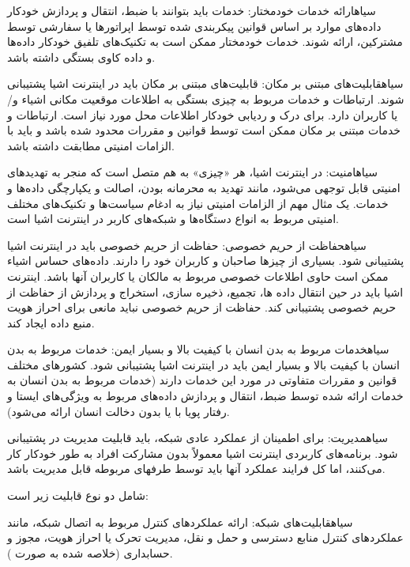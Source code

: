  ‌سیاه{ارائه خدمات خودمختار}:
خدمات باید بتوانند با ضبط، انتقال و پردازش خودکار داده‌های موارد بر اساس قوانین پیکربندی شده توسط اپراتورها یا سفارشی توسط مشترکین، ارائه شوند. خدمات خودمختار ممکن است به تکنیک‌های تلفیق خودکار داده‌ها و داده کاوی بستگی داشته باشد.

 ‌سیاه{قابلیت‌های مبتنی بر مکان}:
قابلیت‌های مبتنی بر مکان باید در اینترنت اشیا پشتیبانی شوند. ارتباطات و خدمات مربوط به چیزی بستگی به اطلاعات موقعیت مکانی اشیاء و/یا کاربران دارد. برای درک و ردیابی خودکار اطلاعات محل مورد نیاز است.
ارتباطات و خدمات مبتنی بر مکان ممکن است توسط قوانین و مقررات محدود شده باشد و باید با الزامات امنیتی مطابقت داشته باشد.

 ‌سیاه{امنیت}:
در اینترنت اشیا، هر «چیزی» به هم متصل است که منجر به تهدیدهای امنیتی قابل توجهی می‌شود، مانند تهدید به محرمانه بودن، اصالت و یکپارچگی داده‌ها و خدمات.
یک مثال مهم از الزامات امنیتی نیاز به ادغام سیاست‌ها و تکنیک‌های مختلف امنیتی مربوط به انواع دستگاه‌ها و شبکه‌های کاربر در اینترنت اشیا است.

 ‌سیاه{حفاظت از حریم خصوصی}:
حفاظت از حریم خصوصی باید در اینترنت اشیا پشتیبانی شود. بسیاری از چیزها صاحبان و کاربران خود را دارند. داده‌های حساس اشیاء ممکن است حاوی اطلاعات خصوصی مربوط به مالکان یا کاربران آنها باشد. اینترنت اشیا باید در حین انتقال داده ها، تجمیع، ذخیره سازی، استخراج و پردازش از حفاظت از حریم خصوصی پشتیبانی کند. حفاظت از حریم خصوصی نباید مانعی برای احراز هویت منبع داده ایجاد کند.

 ‌سیاه{خدمات مربوط به بدن انسان با کیفیت بالا و بسیار ایمن}:
خدمات مربوط به بدن انسان با کیفیت بالا و بسیار ایمن باید در اینترنت اشیا پشتیبانی شود. کشورهای مختلف قوانین و مقررات متفاوتی در مورد این خدمات دارند (خدمات مربوط به بدن انسان به خدمات ارائه شده توسط ضبط، انتقال و پردازش داده‌های مربوط به ویژگی‌های ایستا و رفتار پویا با یا بدون دخالت انسان ارائه می‌شود).

 ‌سیاه{مدیریت}:
برای اطمینان از عملکرد عادی شبکه، باید قابلیت مدیریت در  پشتیبانی شود. برنامه‌های کاربردی اینترنت اشیا معمولاً بدون مشارکت افراد به طور خودکار کار می‌کنند، اما کل فرایند عملکرد آنها باید توسط طرفهای مربوطه قابل مدیریت باشد.



شامل دو نوع قابلیت زیر است:


 ‌سیاه{قابلیت‌های شبکه}:
ارائه عملکردهای کنترل مربوط به اتصال شبکه، مانند عملکردهای کنترل منابع دسترسی و حمل و نقل، مدیریت تحرک یا احراز هویت، مجوز و حسابداری (خلاصه شده به صورت ).

